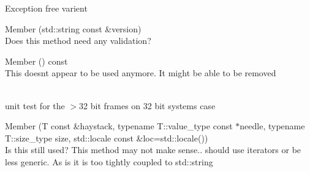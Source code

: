 \begin{DoxyRefList}
Exception free varient 
\item[Member \doxylink{classwebsocketpp_1_1http_1_1parser_1_1parser_a5c2e0e2bc0b2769db5a785b7d47a66ee}{websocketpp\+::http\+::parser\+::parser\+::set\+\_\+version} (std\+::string const \&version)]\hfill \\
\label{todo__todo000015}%
%
Does this method need any validation? 
\item[Member \doxylink{classwebsocketpp_1_1processor_1_1hybi00_a684fe59a368d586593b1c9b97ac8526d}{websocketpp\+::processor\+::hybi00\texorpdfstring{$<$}{<} config \texorpdfstring{$>$}{>}\+::get\+\_\+key3} () const]\hfill \\
\label{todo__todo000021}%
%
This doesn\textquotesingle{}t appear to be used anymore. It might be able to be removed  
\item[Member \doxylink{classwebsocketpp_1_1processor_1_1hybi13_aee8565136bb0820e9a8914dfc5fdb753}{websocketpp\+::processor\+::hybi13\texorpdfstring{$<$}{<} config \texorpdfstring{$>$}{>}\+::validate\+\_\+incoming\+\_\+extended\+\_\+header} (\doxylink{structwebsocketpp_1_1frame_1_1basic__header}{frame\+::basic\+\_\+header} h, \doxylink{structwebsocketpp_1_1frame_1_1extended__header}{frame\+::extended\+\_\+header} e) const]\hfill \\
\label{todo__todo000022}%
%
unit test for the \texorpdfstring{$>$}{>}32 bit frames on 32 bit systems case 
\item[Member \doxylink{namespacewebsocketpp_1_1utility_a90383b2decd273f7a66bbb87c66b5ddd}{websocketpp\+::utility\+::ci\+\_\+find\+\_\+substr} (T const \&haystack, typename T\+::value\+\_\+type const \texorpdfstring{$\ast$}{*}needle, typename T\+::size\+\_\+type size, std\+::locale const \&loc=std\+::locale())]\hfill \\
\label{todo__todo000023}%
%
Is this still used? This method may not make sense.. should use iterators or be less generic. As is it is too tightly coupled to std\+::string
\end{DoxyRefList}